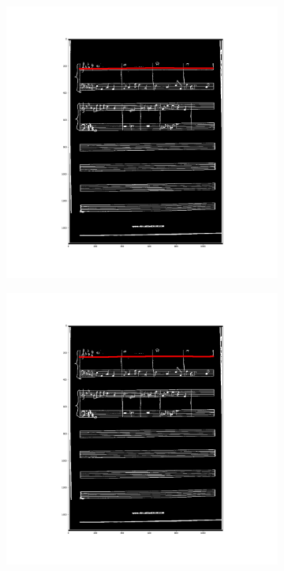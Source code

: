 \documentclass[12pt]{article}
\begin{document}
\begin{figure}[h!]
\begin{subfigure}[b]{0.32\linewidth}
		\end{subfigure}
		\begin{subfigure}[b]{0.32\linewidth}
			\includegraphics[width=\linewidth]{zdj/BFS4.png}
		\end{subfigure}
		\begin{subfigure}[b]{0.32\linewidth}
			\includegraphics[width=\linewidth]{zdj/BFS5.png}

\end{subfigure}
\end{figure}
\end{document}
